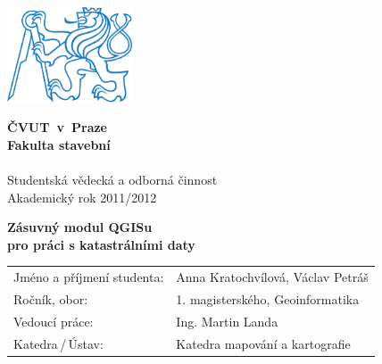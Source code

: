 \pagestyle{empty}
{
\newcommand{\napisCVUT}{ČVUT~v~Praze}
\newcommand{\napisFS}{Fakulta stavební}
\newcommand{\napisSVOC}{Studentská vědecká a odborná činnost}
\newcommand{\napisAK}{Akademický rok  2011/2012}
\newcommand{\napisObor}{Geoinformatika}
\newcommand{\napisKatedra}{Katedra mapování a kartografie}
\newcommand{\napisVedouci}{Ing. Martin Landa}
\newcommand{\napisAutor}{Anna Kratochvílová, Václav Petráš}
\newcommand{\napisRocnik}{1. magisterského}
\newcommand{\napisNazevI}{Zásuvný modul QGISu}
\newcommand{\napisNazevII}{pro práci s katastrálními daty}


\begin{minipage}{0.2\textwidth}
\includegraphics[width=3.7cm]{logo_cvut_modre}
\end{minipage}
\hfill
\begin{minipage}{0.7\textwidth}
\begin{flushright}
\textsf{
\textbf{
\Large
\napisCVUT\\
\napisFS\\
~\\
}
\Large
\napisSVOC\\
\vspace {3pt}
\napisAK
}
\end{flushright}
\end{minipage}


\begin{center}
\vfill
\textsf{
\textbf{
\Huge
\napisNazevI\\
\napisNazevII\\
}}
\vfill
\end{center}

\newcommand{\rtu}[2]{\textsf{#1}&\textsf{#2}\\}
{\fontsize{5mm}{6mm}\selectfont
\begin{tabular}{ll}
\rtu{Jméno a příjmení studenta:}{\napisAutor}
\rtu{Ročník, obor:}{\napisRocnik, \napisObor}
\rtu{Vedoucí práce:}{\napisVedouci}
\rtu{Katedra\,/\,Ústav:}{\napisKatedra}
\end{tabular}
}
}
